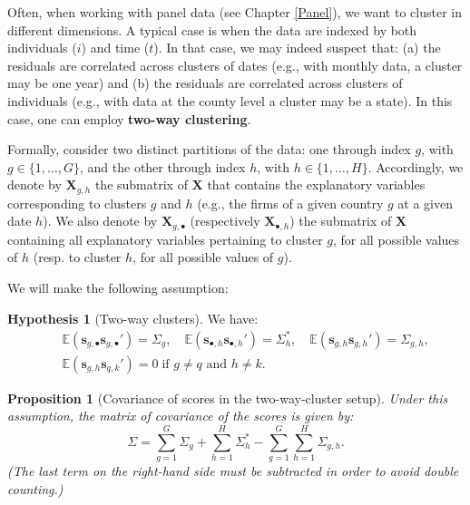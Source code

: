 \documentclass[
  11pt,
]{book}
\newtheorem{proposition}{Proposition}[chapter]
\theoremstyle{definition}
\theoremstyle{definition}
\theoremstyle{definition}
\theoremstyle{definition}
\newtheorem{hypothesis}{Hypothesis}[chapter]
\theoremstyle{remark}
\begin{document}
Often, when working with panel data (see Chapter \ref{Panel}), we want to cluster in different dimensions. A typical case is when the data are indexed by both individuals (\(i\)) and time (\(t\)). In that case, we may indeed suspect that: (a) the residuals are correlated across clusters of dates (e.g., with monthly data, a cluster may be one year) and (b) the residuals are correlated across clusters of individuals (e.g., with data at the county level a cluster may be a state). In this case, one can employ \textbf{two-way clustering}.

Formally, consider two distinct partitions of the data: one through index \(g\), with \(g \in \{1,\dots,G\}\), and the other through index \(h\), with \(h \in \{1,\dots,H\}\). Accordingly, we denote by \(\mathbf{X}_{g,h}\) the submatrix of \(\mathbf{X}\) that contains the explanatory variables corresponding to clusters \(g\) and \(h\) (e.g., the firms of a given country \(g\) at a given date \(h\)). We also denote by \(\mathbf{X}_{g,\bullet}\) (respectively \(\mathbf{X}_{\bullet,h}\)) the submatrix of \(\mathbf{X}\) containing all explanatory variables pertaining to cluster \(g\), for all possible values of \(h\) (resp. to cluster \(h\), for all possible values of \(g\)).

We will make the following assumption:

\begin{hypothesis}[Two-way clusters]
\protect\hypertarget{hyp:twowaycluster}{}\label{hyp:twowaycluster}We have:
\begin{eqnarray*}
&&\mathbb{E}(\mathbf{s}_{g,\bullet}\mathbf{s}_{g,\bullet}')=\Sigma_g,\quad \mathbb{E}(\mathbf{s}_{\bullet,h}\mathbf{s}_{\bullet,h}')=\Sigma^*_h,\quad \mathbb{E}(\mathbf{s}_{g,h}\mathbf{s}_{g,h}')=\Sigma_{g,h},\\ &&\mathbb{E}(\mathbf{s}_{g,h}\mathbf{s}_{q,k}')=0\;\mbox{if }g\neq q\mbox{ and }h \ne k.
\end{eqnarray*}
\end{hypothesis}

\begin{proposition}[Covariance of scores in the two-way-cluster setup]
\protect\hypertarget{prp:twoWayCov}{}\label{prp:twoWayCov}Under this assumption, the matrix of covariance of the scores is given by:
\[
\Sigma = \sum_{g=1}^G \Sigma_{g} + \sum_{h=1}^H \Sigma^*_{h} - \sum_{g=1}^G\sum_{h=1}^H \Sigma_{g,h}.
\]
(The last term on the right-hand side must be subtracted in order to avoid double counting.)
\end{proposition}
\end{document}
